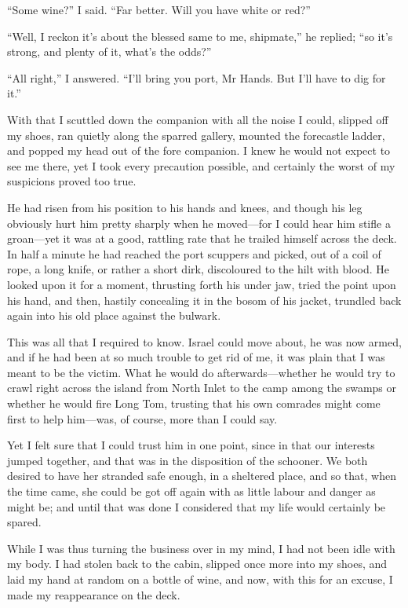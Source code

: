 \enquote{Some wine?} I said. \enquote{Far better. Will you have white or red?}

\enquote{Well, I reckon it’s about the blessed same to me, shipmate,} he replied; \enquote{so it’s strong, and plenty of it, what’s the odds?}

\enquote{All right,} I answered. \enquote{I’ll bring you port, Mr Hands. But I’ll have to dig for it.}

With that I scuttled down the companion with all the noise I could, slipped off my shoes, ran quietly along the sparred gallery, mounted the forecastle ladder, and popped my head out of the fore companion. I knew he would not expect to see me there, yet I took every precaution possible, and certainly the worst of my suspicions proved too true.

He had risen from his position to his hands and knees, and though his leg obviously hurt him pretty sharply when he moved---for I could hear him stifle a groan---yet it was at a good, rattling rate that he trailed himself across the deck. In half a minute he had reached the port scuppers and picked, out of a coil of rope, a long knife, or rather a short dirk, discoloured to the hilt with blood. He looked upon it for a moment, thrusting forth his under jaw, tried the point upon his hand, and then, hastily concealing it in the bosom of his jacket, trundled back again into his old place against the bulwark.

This was all that I required to know. Israel could move about, he was now armed, and if he had been at so much trouble to get rid of me, it was plain that I was meant to be the victim. What he would do afterwards---whether he would try to crawl right across the island from North Inlet to the camp among the swamps or whether he would fire Long Tom, trusting that his own comrades might come first to help him---was, of course, more than I could say.

Yet I felt sure that I could trust him in one point, since in that our interests jumped together, and that was in the disposition of the schooner. We both desired to have her stranded safe enough, in a sheltered place, and so that, when the time came, she could be got off again with as little labour and danger as might be; and until that was done I considered that my life would certainly be spared.

While I was thus turning the business over in my mind, I had not been idle with my body. I had stolen back to the cabin, slipped once more into my shoes, and laid my hand at random on a bottle of wine, and now, with this for an excuse, I made my reappearance on the deck.

